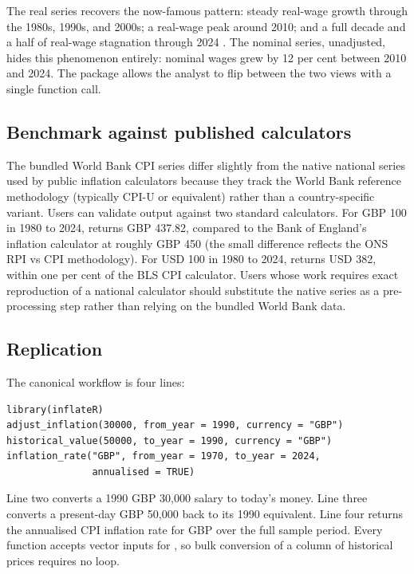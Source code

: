 The real series recovers the now-famous pattern: steady real-wage growth
through the 1980s, 1990s, and 2000s; a real-wage peak around 2010; and a
full decade and a half of real-wage stagnation through 2024
\citep{blundell2023real, giupponi2024labour}. The nominal series,
unadjusted, hides this phenomenon entirely: nominal wages grew by 12 per
cent between 2010 and 2024. The package allows the analyst to flip
between the two views with a single function call.

\FloatBarrier

\subsection{Benchmark against published
calculators}\label{benchmark-against-published-calculators}

The bundled World Bank CPI series differ slightly from the native
national series used by public inflation calculators because they track
the World Bank reference methodology (typically CPI-U or equivalent)
rather than a country-specific variant. Users can validate
 output against two standard calculators. For GBP 100
in 1980 to 2024,  returns GBP 437.82, compared to the Bank of England's
inflation calculator at roughly GBP 450 (the small difference reflects
the ONS RPI vs CPI methodology). For USD 100 in 1980 to 2024,
 returns USD 382, within
one per cent of the BLS CPI calculator. Users whose work requires exact
reproduction of a national calculator should substitute the native
series as a pre-processing step rather than relying on the bundled World
Bank data.

\subsection{Replication}\label{replication}

The canonical workflow is four lines:

\begin{verbatim}
library(inflateR)
adjust_inflation(30000, from_year = 1990, currency = "GBP")
historical_value(50000, to_year = 1990, currency = "GBP")
inflation_rate("GBP", from_year = 1970, to_year = 2024,
               annualised = TRUE)
\end{verbatim}

Line two converts a 1990 GBP 30,000 salary to today's money. Line three
converts a present-day GBP 50,000 back to its 1990 equivalent. Line four
returns the annualised CPI inflation rate for GBP over the full sample
period. Every function accepts vector inputs for , so bulk
conversion of a column of historical prices requires no loop.

